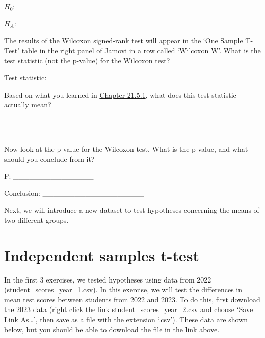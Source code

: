 \documentclass[
]{scrbook}
\begin{document}
\(H_{0}\): \_\_\_\_\_\_\_\_\_\_\_\_\_\_\_\_\_\_\_\_\_\_\_

\(H_{A}\): \_\_\_\_\_\_\_\_\_\_\_\_\_\_\_\_\_\_\_\_\_\_\_

The results of the Wilcoxon signed-rank test will appear in the `One Sample T-Test' table in the right panel of Jamovi in a row called `Wilcoxon W'.
What is the test statistic (not the p-value) for the Wilcoxon test?

Test statistic: \_\_\_\_\_\_\_\_\_\_\_\_\_\_\_\_\_\_

Based on what you learned in \protect\hyperlink{wilcoxon-test}{Chapter 21.5.1}, what does this test statistic actually mean?

\begin{verbatim}



\end{verbatim}

Now look at the p-value for the Wilcoxon test.
What is the p-value, and what should you conclude from it?

P: \_\_\_\_\_\_\_\_\_\_\_\_\_\_\_

Conclusion: \_\_\_\_\_\_\_\_\_\_\_\_\_\_\_\_\_\_\_

Next, we will introduce a new dataset to test hypotheses concerning the means of two different groups.

\hypertarget{independent-samples-t-test-1}{%
\section{Independent samples t-test}\label{independent-samples-t-test-1}}

In the first 3 exercises, we tested hypotheses using data from 2022 (\href{https://raw.githubusercontent.com/bradduthie/statistical_techniques/main/data/student_scores_year_1.csv}{student\_scores\_year\_1.csv}).
In this exercise, we will test the differences in mean test scores between students from 2022 and 2023.
To do this, first download the 2023 data (right click the link \href{https://raw.githubusercontent.com/bradduthie/statistical_techniques/main/data/student_scores_year_2.csv}{student\_scores\_year\_2.csv} and choose `Save Link As\ldots{}', then save as a file with the extension `.csv').
These data are shown below, but you should be able to download the file in the link above.
\end{document}
